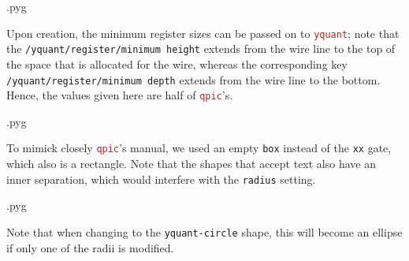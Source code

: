 \documentclass{scrartcl}
\makeatletter
\newenvironment{codeexample}{%
   \VerbatimEnvironment%
   \let\FVB@VerbatimOut\minted@FVB@VerbatimOut
   \let\FVE@VerbatimOut\minted@FVE@VerbatimOut
   \minted@configlang{tex}%
   \minted@fvset
   \begin{VerbatimOut}[codes={\catcode`\^^I=12},firstline,lastline]{\minted@jobname.pyg}%
}{
   \end{VerbatimOut}%
   \minted@langlinenoson%
   \savebox\codeexamplebox{ \minted@jobname.pyg}%
   \ifdim\wd\codeexamplebox>\dimexpr.5\linewidth-3mm\relax%
      \wd\codeexamplebox=.5\linewidth%
   \else%
      \wd\codeexamplebox=\dimexpr\wd\codeexamplebox+3mm\relax%
   \fi%
   \noindent\begin{minipage}{\wd\codeexamplebox}%
      \centering%
      \usebox\codeexamplebox%
   \end{minipage}%
   \begin{minipage}{\dimexpr\linewidth-\wd\codeexamplebox\relax}%
      \expandafter\minted@pygmentize\expandafter{\minted@lang}%
   \end{minipage}%
   \minted@langlinenosoff%
   \par%
}
\def\pkg#1{\textcolor{brown}{\texttt{#1}}}
\def\ttlink{\link\texttt}
\def\Yquant{\pkg{yquant}}
\makeatother
\begin{document}
               \begin{example}
                  \begin{codeexample}
                  \end{codeexample}
                  Upon creation, the minimum register sizes can be passed on to \Yquant; note that the \ttlink{/yquant/register/minimum height} extends from the wire line to the top of the space that is allocated for the wire, whereas the corresponding key \ttlink{/yquant/register/minimum depth} extends from the wire line to the bottom.
                  Hence, the values given here are half of \pkg{qpic}'s.
               \end{example}

               \begin{example}
                  \begin{codeexample}
                  \end{codeexample}
                  To mimick closely \pkg{qpic}'s manual, we used an empty \ttlink{box} instead of the \ttlink{xx} gate, which also is a rectangle.
                  Note that the shapes that accept text also have an inner separation, which would interfere with the \texttt{radius} setting.
               \end{example}

               \begin{example}
                  \begin{codeexample}
                  \end{codeexample}
                  Note that when changing to the \texttt{yquant-circle} shape, this will become an ellipse if only one of the radii is modified.
               \end{example}
\end{document}
